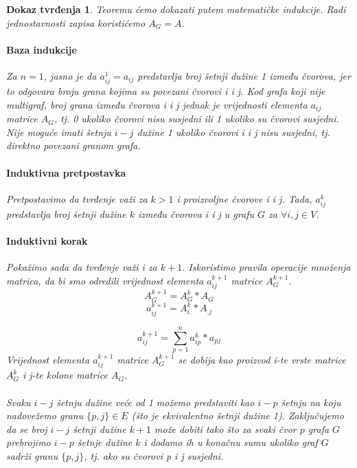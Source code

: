 \documentclass[11pt]{article}
\newtheorem*{custom_proof}{Dokaz tvrđenja}
\begin{document}
		\begin{custom_proof}
		    Teoremu ćemo dokazati putem matematičke indukcije. Radi jednostavnosti zapisa koristićemo $A_G = A$.
			
			\paragraph{Baza indukcije}
			Za $n=1$, jasno je da $a_{ij}^1 = a_{ij}$ predstavlja broj šetnji dužine 1 između čvorova, jer to odgovara broju grana kojima su povezani čvorovi \emph{i} i \emph{j}. 
			Kod grafa koji nije multigraf, broj grana između čvorova \emph{i} i \emph{j} jednak je vrijednosti elementa $a_{ij}$ matrice $A_G$, tj. 0 ukoliko čvorovi nisu susjedni ili 1 ukoliko su čvorovi susjedni. 
			Nije moguće imati šetnju $i-j$ dužine 1 ukoliko čvorovi \emph{i} i \emph{j} nisu susjedni, tj. direktno povezani granom grafa. 
			
			\paragraph{Induktivna pretpostavka}
			Pretpostavimo da tvrđenje važi za $k>1$ i proizvoljne čvorove \emph{i} i \emph{j}. Tada, $a_{ij}^k$ predstavlja broj šetnji dužine $k$ između čvorova \emph{i} i \emph{j} u grafu $G$ za $\forall i,j \in V$. 
			
			\paragraph{Induktivni korak}
			Pokažimo sada da tvrđenje važi i za $k+1$.
			Iskoristimo pravila operacije množenja matrica, da bi smo odredili vrijednost elementa $a_{ij}^{k+1}$ matrice $A_G^{k+1}$.  
			\[
				A_G^{k+1} = A_G^k * A_G
			\]
			\[
				a_{ij}^{k+1} = A_{i.}^k * A_{.j} 
			\]

			\begin{equation}
			a_{ij}^{k+1} = \sum_{p=1}^{n} a_{ip}^k * a_{pj}
			\label{eq:element}
			\end{equation}
			Vrijednost elementa $a_{ij}^{k+1}$ matrice $A_G^{k+1}$ se dobija kao proizvod i-te vrste matrice $A_G^k$ i j-te kolone matrice $A_G$. 
			
			\paragraph{}
			Svaku $i-j$ šetnju dužine veće od 1 možemo predstaviti kao $i-p$ šetnju na koju nadovežemo granu $\{p,j\} \in E$ (što je ekvivalentno šetnji dužine 1). 
			Zaključujemo da se broj $i-j$ šetnji dužine $k+1$ može dobiti tako što za svaki čvor $p$ grafa $G$ prebrojimo $i-p$ šetnje dužine $k$ i dodamo ih u konačnu sumu ukoliko graf $G$ sadrži granu $\{p,j\}$,
			tj. ako su čvorovi p i j susjedni.
		

\end{custom_proof}
\end{document}
